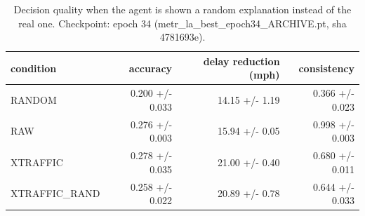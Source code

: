 \begin{table}[t]
\centering
\caption{Decision quality when the agent is shown a random explanation instead of the real one. Checkpoint: epoch 34 (metr\_la\_best\_epoch34\_ARCHIVE.pt, sha 4781693e).}
\label{tab:decisions}
\begin{tabular}{lrrr}
\toprule
condition & accuracy & delay reduction (mph) & consistency \\
\midrule
RANDOM & 0.200 +/- 0.033 & 14.15 +/- 1.19 & 0.366 +/- 0.023 \\
RAW & 0.276 +/- 0.003 & 15.94 +/- 0.05 & 0.998 +/- 0.003 \\
XTRAFFIC & 0.278 +/- 0.035 & 21.00 +/- 0.40 & 0.680 +/- 0.011 \\
XTRAFFIC_RAND & 0.258 +/- 0.022 & 20.89 +/- 0.78 & 0.644 +/- 0.033 \\
\bottomrule
\end{tabular}
\end{table}
